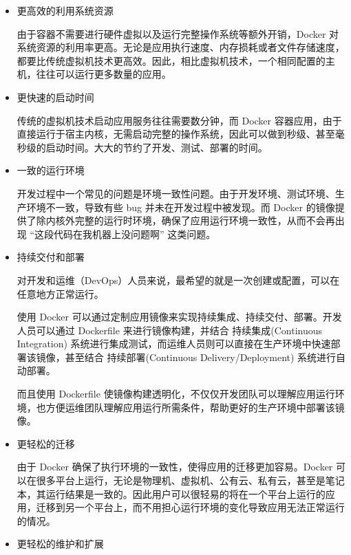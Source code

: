 \begin{itemize}
\item 更高效的利用系统资源

由于容器不需要进行硬件虚拟以及运行完整操作系统等额外开销，Docker 对系统资源的利用率更高。无论是应用执行速度、内存损耗或者文件存储速度，都要比传统虚拟机技术更高效。因此，相比虚拟机技术，一个相同配置的主机，往往可以运行更多数量的应用。
\item 更快速的启动时间

传统的虚拟机技术启动应用服务往往需要数分钟，而 Docker 容器应用，由于直接运行于宿主内核，无需启动完整的操作系统，因此可以做到秒级、甚至毫秒级的启动时间。大大的节约了开发、测试、部署的时间。
\item 一致的运行环境

开发过程中一个常见的问题是环境一致性问题。由于开发环境、测试环境、生产环境不一致，导致有些 bug 并未在开发过程中被发现。而 Docker 的镜像提供了除内核外完整的运行时环境，确保了应用运行环境一致性，从而不会再出现 “这段代码在我机器上没问题啊” 这类问题。
\item 持续交付和部署

对开发和运维（DevOps）人员来说，最希望的就是一次创建或配置，可以在任意地方正常运行。

使用 Docker 可以通过定制应用镜像来实现持续集成、持续交付、部署。开发人员可以通过 Dockerfile 来进行镜像构建，并结合 持续集成(Continuous Integration) 系统进行集成测试，而运维人员则可以直接在生产环境中快速部署该镜像，甚至结合 持续部署(Continuous Delivery/Deployment) 系统进行自动部署。

而且使用 Dockerfile 使镜像构建透明化，不仅仅开发团队可以理解应用运行环境，也方便运维团队理解应用运行所需条件，帮助更好的生产环境中部署该镜像。
\item 更轻松的迁移

由于 Docker 确保了执行环境的一致性，使得应用的迁移更加容易。Docker 可以在很多平台上运行，无论是物理机、虚拟机、公有云、私有云，甚至是笔记本，其运行结果是一致的。因此用户可以很轻易的将在一个平台上运行的应用，迁移到另一个平台上，而不用担心运行环境的变化导致应用无法正常运行的情况。
\item 更轻松的维护和扩展


\end{itemize}
